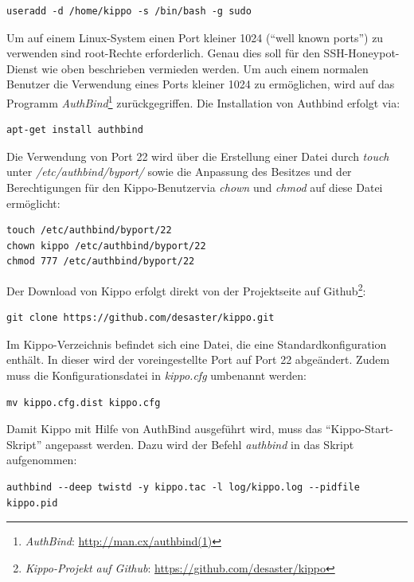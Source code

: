 \begin{lstlisting}[style=customc]
useradd -d /home/kippo -s /bin/bash -g sudo
\end{lstlisting}

Um auf einem Linux-System einen Port kleiner 1024 ("`well known ports"') zu verwenden sind root-Rechte erforderlich. Genau dies soll für den SSH-Honeypot-Dienst wie oben beschrieben vermieden werden. Um auch einem normalen Benutzer die Verwendung eines Ports kleiner 1024 zu ermöglichen, wird auf das Programm \textit{AuthBind}\footnote{ \textit{AuthBind}: \url{http://man.cx/authbind(1)}} zurückgegriffen. Die Installation von Authbind erfolgt via:

\begin{lstlisting}[style=customc]
apt-get install authbind
\end{lstlisting}

Die Verwendung von Port 22 wird über die Erstellung einer Datei durch \textit{touch} unter \textit{/etc/authbind/byport/} sowie die Anpassung des Besitzes und der Berechtigungen für den Kippo-Benutzervia \textit{chown} und \textit{chmod} auf diese Datei ermöglicht:

\begin{lstlisting}[style=customc]
touch /etc/authbind/byport/22
chown kippo /etc/authbind/byport/22
chmod 777 /etc/authbind/byport/22
\end{lstlisting}

Der Download von Kippo erfolgt direkt von der Projektseite auf Github\footnote{ \textit{Kippo-Projekt auf Github}: \url{https://github.com/desaster/kippo}}:

\begin{lstlisting}[style=customc]
git clone https://github.com/desaster/kippo.git
\end{lstlisting}

Im Kippo-Verzeichnis befindet sich eine Datei, die eine Standardkonfiguration enthält. In dieser wird der  voreingestellte Port auf Port 22 abgeändert. Zudem muss die Konfigurationsdatei in \textit{kippo.cfg} umbenannt werden:

\begin{lstlisting}[style=customc]
mv kippo.cfg.dist kippo.cfg
\end{lstlisting}

Damit Kippo mit Hilfe von AuthBind ausgeführt wird, muss das "`Kippo-Start-Skript"' angepasst werden. Dazu wird der Befehl \textit{authbind} in das Skript aufgenommen:

\begin{lstlisting}[style=customc]
authbind --deep twistd -y kippo.tac -l log/kippo.log --pidfile kippo.pid
\end{lstlisting}

